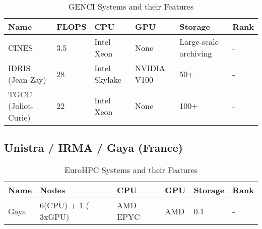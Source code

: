 \begin{table}[h!]
    \centering
    \begin{tabular}{l l l l l l}
    \toprule
    \textbf{Name} & \textbf{FLOPS} & \textbf{CPU} & \textbf{GPU} & \textbf{Storage} & \textbf{Rank} \\
    \midrule
    CINES & 3.5 & Intel Xeon & None & Large-scale archiving & - \\
    IDRIS (Jean Zay) & 28 & Intel Skylake & NVIDIA V100 & 50+ & - \\
    TGCC (Joliot-Curie) & 22 & Intel Xeon & None & 100+ & - \\
    \bottomrule
    \end{tabular}
    \caption{GENCI Systems and their Features}
    \end{table}

\subsection*{Unistra / IRMA / Gaya (France)}
\label{sec:arch:gaya}

\begin{table}[h!]
    \centering
    \begin{tabular}{l l l l l l}
    \toprule
    \textbf{Name} & \textbf{Nodes} & \textbf{CPU} & \textbf{GPU} & \textbf{Storage} & \textbf{Rank} \\
    \midrule
    Gaya &  6(CPU) + 1 ( 3xGPU) & AMD EPYC & AMD & 0.1  & - \\
    \bottomrule
    \end{tabular}
    \caption{EuroHPC Systems and their Features}
    \end{table}

